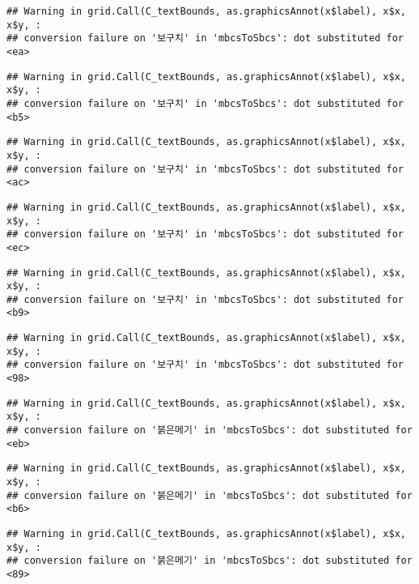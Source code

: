 \documentclass[
]{article}
\begin{document}
\begin{verbatim}
## Warning in grid.Call(C_textBounds, as.graphicsAnnot(x$label), x$x, x$y, :
## conversion failure on '보구치' in 'mbcsToSbcs': dot substituted for <ea>
\end{verbatim}

\begin{verbatim}
## Warning in grid.Call(C_textBounds, as.graphicsAnnot(x$label), x$x, x$y, :
## conversion failure on '보구치' in 'mbcsToSbcs': dot substituted for <b5>
\end{verbatim}

\begin{verbatim}
## Warning in grid.Call(C_textBounds, as.graphicsAnnot(x$label), x$x, x$y, :
## conversion failure on '보구치' in 'mbcsToSbcs': dot substituted for <ac>
\end{verbatim}

\begin{verbatim}
## Warning in grid.Call(C_textBounds, as.graphicsAnnot(x$label), x$x, x$y, :
## conversion failure on '보구치' in 'mbcsToSbcs': dot substituted for <ec>
\end{verbatim}

\begin{verbatim}
## Warning in grid.Call(C_textBounds, as.graphicsAnnot(x$label), x$x, x$y, :
## conversion failure on '보구치' in 'mbcsToSbcs': dot substituted for <b9>
\end{verbatim}

\begin{verbatim}
## Warning in grid.Call(C_textBounds, as.graphicsAnnot(x$label), x$x, x$y, :
## conversion failure on '보구치' in 'mbcsToSbcs': dot substituted for <98>
\end{verbatim}

\begin{verbatim}
## Warning in grid.Call(C_textBounds, as.graphicsAnnot(x$label), x$x, x$y, :
## conversion failure on '붉은메기' in 'mbcsToSbcs': dot substituted for <eb>
\end{verbatim}

\begin{verbatim}
## Warning in grid.Call(C_textBounds, as.graphicsAnnot(x$label), x$x, x$y, :
## conversion failure on '붉은메기' in 'mbcsToSbcs': dot substituted for <b6>
\end{verbatim}

\begin{verbatim}
## Warning in grid.Call(C_textBounds, as.graphicsAnnot(x$label), x$x, x$y, :
## conversion failure on '붉은메기' in 'mbcsToSbcs': dot substituted for <89>
\end{verbatim}
\end{document}
